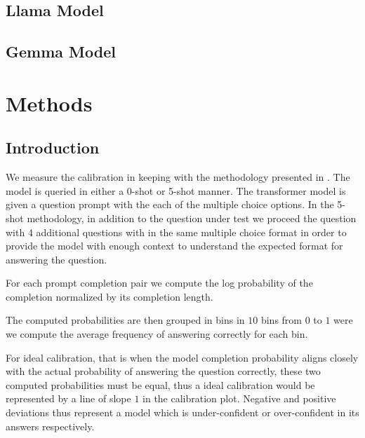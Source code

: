 \documentclass[11pt]{article}
\begin{document}
\subsection{Llama Model}

\subsection{Gemma Model}



\section{Methods}

\subsection{Introduction}

We measure the calibration in keeping with the methodology presented 
in  \cite{kadavath2022language}. The model is queried in either a
0-shot or 5-shot manner. The transformer model is given a question 
prompt  with the each of the multiple choice options.  In the 5-shot 
methodology, in addition to the question under test we proceed the 
question with 4 additional questions with in the same multiple 
choice format in order to provide the model with enough context to 
understand the expected format for answering the question.

For each prompt completion pair we compute the log probability of 
the completion normalized by its completion length. 


The computed probabilities are then grouped in bins in $10$ bins from 
$0$ to $1$ were we compute the average frequency of answering 
correctly for each bin. 

For ideal calibration, that is when the model completion probability aligns
closely with the actual probability of answering the question correctly, these 
two computed probabilities must be equal, thus a ideal calibration would be 
represented  by a line of slope $1$ in the calibration plot. Negative 
and positive deviations thus represent a model which is under-confident 
or over-confident  in its answers respectively.
\end{document}
